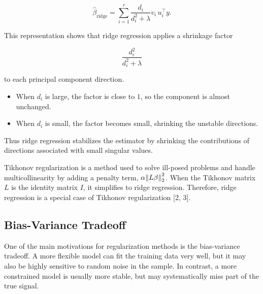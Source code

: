 \documentclass[
  letterpaper,
  DIV=11,
  numbers=noendperiod]{scrreprt}
\providecommand{\tightlist}{%
  \setlength{\itemsep}{0pt}\setlength{\parskip}{0pt}}
\theoremstyle{definition}
\theoremstyle{definition}
\theoremstyle{plain}
\theoremstyle{plain}
\theoremstyle{remark}
\begin{document}
\[
\hat{\beta}_{\text{ridge}}
=
\sum_{i=1}^{r}
\frac{d_i}{d_i^2+\lambda}
v_i\,u_i^\top y .
\]

This representation shows that ridge regression applies a shrinkage
factor

\[
\frac{d_i^2}{d_i^2+\lambda}
\]

to each principal component direction.

\begin{itemize}
\tightlist
\item
  When \(d_i\) is large, the factor is close to \(1\), so the component
  is almost unchanged.
\item
  When \(d_i\) is small, the factor becomes small, shrinking the
  unstable directions.
\end{itemize}

Thus ridge regression stabilizes the estimator by shrinking the
contributions of directions associated with small singular values.

\begin{tcolorbox}[enhanced jigsaw, arc=.35mm, bottomrule=.15mm, bottomtitle=1mm, breakable, colback=white, colbacktitle=quarto-callout-tip-color!10!white, colframe=quarto-callout-tip-color-frame, coltitle=black, left=2mm, leftrule=.75mm, opacityback=0, opacitybacktitle=0.6, rightrule=.15mm, title=\textcolor{quarto-callout-tip-color}{\faLightbulb}\hspace{0.5em}{Tikhonov regularization}, titlerule=0mm, toprule=.15mm, toptitle=1mm]

Tikhonov regularization is a method used to solve ill-posed problems and
handle multicollinearity by adding a penalty term,
\(\alpha\norm{L\beta}_2^2\). When the Tikhonov matrix \(L\) is the
identity matrix \(I\), it simplifies to ridge regression. Therefore,
ridge regression is a special case of Tikhonov regularization {[}2,
3{]}.

\end{tcolorbox}

\subsection{Bias-Variance Tradeoff}\label{bias-variance-tradeoff}

One of the main motivations for regularization methods is the
bias-variance tradeoff. A more flexible model can fit the training data
very well, but it may also be highly sensitive to random noise in the
sample. In contrast, a more constrained model is usually more stable,
but may systematically miss part of the true signal.
\end{document}
